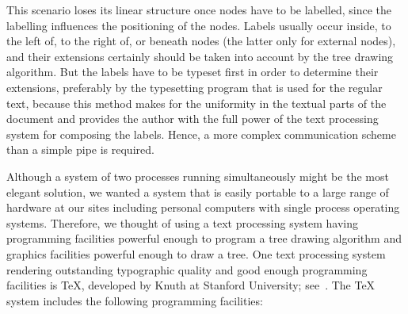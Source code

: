 This scenario loses its linear structure once nodes have to be labelled, since
the labelling influences the positioning of the nodes. Labels usually occur
inside, to the left of, to the right of, or beneath nodes (the latter only for
external nodes), and their extensions certainly should be taken into account
by the  tree drawing algorithm. But the labels have to be typeset first
in order to determine their extensions,
preferably by the typesetting program that
is used for the regular text, because this method makes for the uniformity in the textual
parts of the document and provides the author with the full power of the
text processing system for composing the labels. Hence, a more complex
communication scheme than a simple pipe is required.

Although a system of two processes running simultaneously might be the most
elegant solution, we wanted a system that is easily portable to
a large range of hardware at our sites 
including personal computers with single process
operating systems.                                                           
Therefore, we thought of using a text processing system                              
having programming facilities powerful enough to program a tree drawing algorithm                      
and graphics facilities powerful enough                                                             
to draw a tree. One text processing system                  
rendering outstanding typographic quality and good enough programming           
facilities is \TeX, developed by Knuth at Stanford University;                  
see~\cite{TeXbook}.                                                             
The \TeX{} system includes the following programming facilities:                
                                                                                
